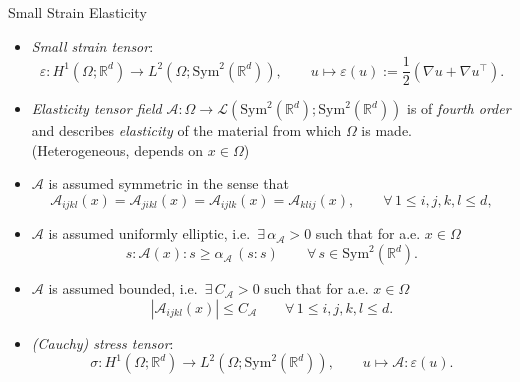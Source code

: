 \documentclass[10pt,aspectratio=169]{beamer}
\def\R{{\mathbb R}}
\def\cA{{\mathcal A}}
\def\cL{{\mathcal L}}
\def\symd{{\mathrm{Sym}^2(\R^d)}}
\begin{document}
\begin{frame}{Small Strain Elasticity}
	\begin{itemize}
		\item {\em Small strain tensor}:
		      \begin{equation*}
			      \varepsilon:H^1(\Omega;\R^d)\to L^2(\Omega;\symd),\qquad u\mapsto \varepsilon(u):= \frac{1}{2}\left(\nabla u + \nabla u^\top\right).
		      \end{equation*}
		\item {\em Elasticity tensor field} $\cA:\Omega\to\cL(\symd;\symd)$ is of {\em fourth order} and describes {\em elasticity} of the material from which $\Omega$ is made. (Heterogeneous, depends on $x\in\Omega$)
		\item $\cA$ is assumed symmetric in the sense that
		      \begin{equation*}
			      \cA_{ijkl}(x)=\cA_{jikl}(x)=\cA_{ijlk}(x)=\cA_{klij}(x),
			      \qquad \forall\,1\le i,j,k,l\le d,
		      \end{equation*}
		\item $\cA$ is assumed uniformly elliptic, i.e.\ $\exists\,\alpha_{\cA}>0$ such that for a.e. $x\in\Omega$
		      \begin{equation*}
			      s:\cA(x):s \ge \alpha_\cA\, (s:s)\qquad \forall\,s\in \symd.
		      \end{equation*}
		\item $\cA$ is assumed bounded, i.e.\ $\exists\,C_{\cA}>0$ such that for a.e. $x\in\Omega$
		      \begin{equation*}
			      |\cA_{ijkl}(x)|\le C_\cA \qquad \forall\,1\le i,j,k,l\le d.
		      \end{equation*}
		\item {\em (Cauchy) stress tensor}:
		      \begin{equation*}
			      \sigma: H^1(\Omega;\R^d)\to L^2(\Omega;\symd),\qquad u\mapsto \cA : \varepsilon(u).
		      \end{equation*}
	\end{itemize}
\end{frame}
\end{document}
